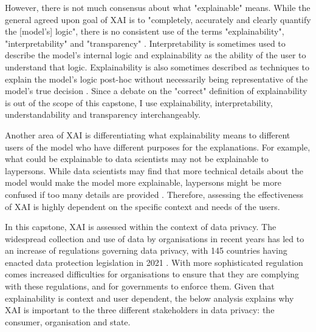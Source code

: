 However, there is not much consensus about what "explainable" means. While the general agreed upon goal of XAI is to "completely, accurately and clearly quantify the [model's] logic", there is no consistent use of the terms "explainability", "interpretability" and "transparency" \cite{danilevsky2020}. Interpretability is sometimes used to describe the model's internal logic and explainability as the ability of the user to understand that logic. Explainability is also sometimes described as techniques to explain the model's logic post-hoc without necessarily being representative of the model's true decision \cite{rosenfeld2021}. Since a debate on the "correct" definition of explainability is out of the scope of this capstone, I use explainability, interpretability, understandability and transparency interchangeably.

Another area of XAI is differentiating what explainability means to different users of the model who have different purposes for the explanations. For example, what could be explainable to data scientists may not be explainable to laypersons. While data scientists may find that more technical details about the model would make the model more explainable, laypersons might be more confused if too many details are provided \cite{rosenfeld2021}. Therefore, assessing the effectiveness of XAI is highly dependent on the specific context and needs of the users. 

In this capstone, XAI is assessed within the context of data privacy. The widespread collection and use of data by organisations in recent years has led to an increase of regulations governing data privacy, with 145 countries having enacted data protection legislation in 2021 \cite{gstrein2022}. With more sophisticated regulation comes increased difficulties for organisations to ensure that they are complying with these regulations, and for governments to enforce them. Given that explainability is context and user dependent, the below analysis explains why XAI is important to the three different stakeholders in data privacy: the consumer, organisation and state.

